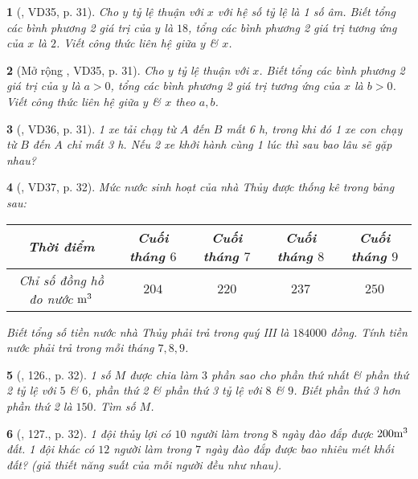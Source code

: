 \documentclass{article}
\newtheorem{baitoan}{}
\begin{document}
\begin{baitoan}[\cite{Tuyen_Toan_7}, VD35, p. 31]
	Cho $y$ tỷ lệ thuận với $x$ với hệ số tỷ lệ là 1 số âm. Biết tổng các bình phương 2 giá trị của $y$ là $18$, tổng các bình phương 2 giá trị tương ứng của $x$ là $2$. Viết công thức liên hệ giữa $y$ \& $x$.
\end{baitoan}

\begin{baitoan}[Mở rộng \cite{Tuyen_Toan_7}, VD35, p. 31]
	Cho $y$ tỷ lệ thuận với $x$. Biết tổng các bình phương 2 giá trị của $y$ là $a > 0$, tổng các bình phương 2 giá trị tương ứng của $x$ là $b > 0$. Viết công thức liên hệ giữa $y$ \& $x$ theo $a,b$.
\end{baitoan}

\begin{baitoan}[\cite{Tuyen_Toan_7}, VD36, p. 31]
	1 xe tải chạy từ $A$ đến $B$ mất {\rm6 h}, trong khi đó 1 xe con chạy từ $B$ đến $A$ chỉ mất {\rm3 h}. Nếu 2 xe khởi hành cùng 1 lúc thì sau bao lâu sẽ gặp nhau?
\end{baitoan}

\begin{baitoan}[\cite{Tuyen_Toan_7}, VD37, p. 32]
	Mức nước sinh hoạt của nhà Thủy được thống kê trong bảng sau:	
	\begin{table}[H]
		\centering
		\begin{tabular}{|c|c|c|c|c|}
			\hline
			Thời điểm & Cuối tháng $6$ & Cuối tháng $7$ & Cuối tháng $8$ & Cuối tháng $9$ \\
			\hline
			Chỉ số đồng hồ đo nước $\rm m^3$ & $204$ & $220$ & $237$ & $250$ \\
			\hline
		\end{tabular}
	\end{table}
	\noindent Biết tổng số tiền nước nhà Thủy phải trả trong quý III là $184000$ đồng. Tính tiền nước phải trả trong mỗi tháng $7,8,9$.
\end{baitoan}

\begin{baitoan}[\cite{Tuyen_Toan_7}, 126., p. 32]
	1 số $M$ được chia làm $3$ phần sao cho phần thứ nhất \& phần thứ 2 tỷ lệ với $5$ \& $6$, phần thứ 2 \& phần thứ 3 tỷ lệ với $8$ \& $9$. Biết phần thứ 3 hơn phần thứ 2 là $150$. Tìm số $M$.
\end{baitoan}

\begin{baitoan}[\cite{Tuyen_Toan_7}, 127., p. 32]
	1 đội thủy lợi có $10$ người làm trong $8$ ngày đào đắp được $\rm200m^3$ đất. 1 đội khác có $12$ người làm trong $7$ ngày đào đắp được bao nhiêu mét khối đất? (giả thiết năng suất của mỗi người đều như nhau).
\end{baitoan}
\end{document}
